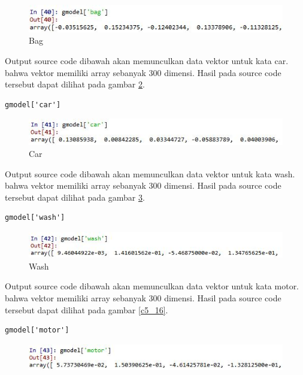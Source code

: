 \begin{enumerate}
\begin{verbatim}
\end{verbatim}
\begin{figure}[ht]
	\centerline{\includegraphics[width=1\textwidth]{figures/huda/chapter5/13.JPG}}
	\caption{Bag}
	\label{c5_13}
\end{figure}
\subitem Output source code dibawah akan memunculkan data vektor untuk kata car. bahwa vektor memiliki array sebanyak 300 dimensi. Hasil pada source code tersebut dapat dilihat pada gambar \ref{c5_14}.
\begin{verbatim}
gmodel['car']
\end{verbatim}
\begin{figure}[ht]
	\centerline{\includegraphics[width=1\textwidth]{figures/huda/chapter5/14.JPG}}
	\caption{Car}
	\label{c5_14}
\end{figure}
\subitem Output source code dibawah akan memunculkan data vektor untuk kata wash. bahwa vektor memiliki array sebanyak 300 dimensi. Hasil pada source code tersebut dapat dilihat pada gambar \ref{c5_15}.
\begin{verbatim}
gmodel['wash']
\end{verbatim}
\begin{figure}[ht]
	\centerline{\includegraphics[width=1\textwidth]{figures/huda/chapter5/15.JPG}}
	\caption{Wash}
	\label{c5_15}
\end{figure}
\subitem Output source code dibawah akan memunculkan data vektor untuk kata motor. bahwa vektor memiliki array sebanyak 300 dimensi. Hasil pada source code tersebut dapat dilihat pada gambar \ref{c5_16}.
\begin{verbatim}
gmodel['motor']
\end{verbatim}
\begin{figure}[ht]
	\centerline{\includegraphics[width=1\textwidth]{figures/huda/chapter5/16.JPG}}

\end{figure}
\end{enumerate}
